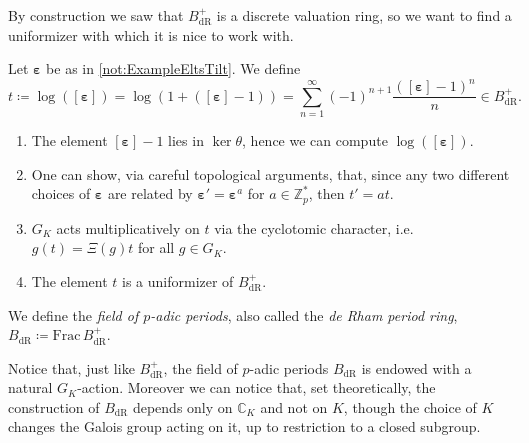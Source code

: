 \noindent
By construction we saw that $B_{\mathrm{dR}}^+$ is a discrete valuation ring,
so we want to find a uniformizer with which it is nice to work with.
\begin{defn}[]
	Let $\boldsymbol\varepsilon$ be as in \cref{not:ExampleEltsTilt}.
	We define
	\begin{equation*}
		t \coloneqq \log \left( [\boldsymbol\varepsilon] \right) =
		\log \left( 1 + ([\boldsymbol\varepsilon] - 1)\right) =
		\sum_{n = 1 }^{ \infty } (-1)^{n+1} 
		\frac{ ([\boldsymbol\varepsilon] - 1)^n }{ n }
		\in B_{\mathrm{dR}}^+
	.\end{equation*}
\end{defn}


\begin{rem}\leavevmode\vspace{-\baselineskip}
\begin{enumerate}
	\item The element $[\boldsymbol\varepsilon] - 1 $ lies in
		$\ker \theta$, hence we can compute $\log ([\boldsymbol\varepsilon])$.

	\item One can show, via careful topological arguments, that,
		since any two different choices of $\boldsymbol\varepsilon$
		are related by $\boldsymbol\varepsilon' = \boldsymbol\varepsilon^a$
		for $a \in \mathbb{Z}_{p}^*$, then
		$t' = a t$.

	\item $G_K$ acts multiplicatively on $t$ via the cyclotomic character,
		i.e. $g(t) = \Xi(g) t$ for all $g \in G_K$.

	\item The element $t$ is a uniformizer of $B_{\mathrm{dR}}^+$.
\end{enumerate}
\end{rem}


\begin{defn}
	We define the {\em field of $p$-adic periods}, also called
	the {\em de Rham period ring}, 
	$B_{\mathrm{dR}} \coloneqq \mathrm{Frac}\, B_{\mathrm{dR}}^+$.
\end{defn}


\begin{rem}[]
	Notice that, just like $B_{\mathrm{dR}}^+$, the field of $p$-adic periods
	$B_{\mathrm{dR}}$ is endowed with a natural $G_K$-action.
	Moreover we can notice that, set theoretically, the construction of
	$B_{\mathrm{dR}}$ depends only on $\mathbb{C}_K$ and not on $K$,
	though the choice of $K$ changes the Galois group acting on it,
	up to restriction to a closed subgroup.
\end{rem}




